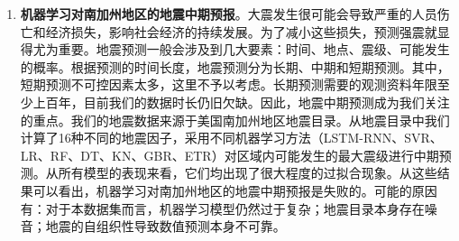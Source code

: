 \begin{enumerate}
    \item \textbf{机器学习对南加州地区的地震中期预报}。大震发生很可能会导致严重的人员伤亡和经济损失，影响社会经济的持续发展。为了减小这些损失，预测强震就显得尤为重要。地震预测一般会涉及到几大要素：时间、地点、震级、可能发生的概率。根据预测的时间长度，地震预测分为长期、中期和短期预测。其中，短期预测不可控因素太多，这里不予以考虑。长期预测需要的观测资料年限至少上百年，目前我们的数据时长仍旧欠缺。因此，地震中期预测成为我们关注的重点。我们的地震数据来源于美国南加州地区地震目录。从地震目录中我们计算了16种不同的地震因子，采用不同机器学习方法（LSTM-RNN、SVR、LR、RF、DT、KN、GBR、ETR）对区域内可能发生的最大震级进行中期预测。从所有模型的表现来看，它们均出现了很大程度的过拟合现象。从这些结果可以看出，机器学习对南加州地区的地震中期预报是失败的。可能的原因有：对于本数据集而言，机器学习模型仍然过于复杂；地震目录本身存在噪音；地震的自组织性导致数值预测本身不可靠。

\end{enumerate}